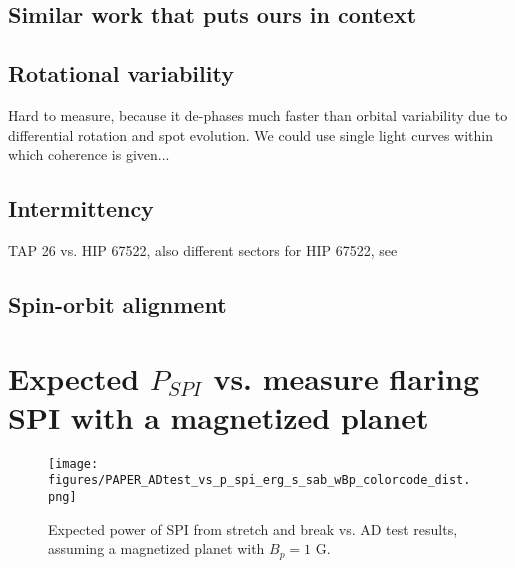\documentclass[twocolumn]{aastex631}
\begin{document}
\subsection{Similar work that puts ours in context}

\subsection{Rotational variability}
Hard to measure, because it de-phases much faster than orbital variability due to differential rotation and spot evolution. We could use single light curves within which coherence is given...

\subsection{Intermittency}

TAP 26 vs. HIP 67522, also different sectors for HIP 67522, see \cite{shkolnik2008nature}

\subsection{Spin-orbit alignment}



\appendix
\section{Expected $P_{SPI}$ vs. measure flaring SPI with a magnetized planet}

\begin{figure*}[ht!]
    \begin{centering}
        \texttt{[image: figures/PAPER\_ADtest\_vs\_p\_spi\_erg\_s\_sab\_wBp\_colorcode\_dist.png]}
        \caption{
            Expected power of SPI from stretch and break vs. AD test results, assuming a magnetized planet with $B_p=1$ G. 
        }
        \label{appendix:fig:adtest_p_spi_erg_s}
    \end{centering}
\end{figure*}
\end{document}
